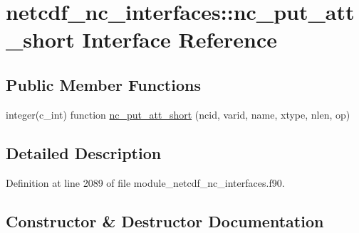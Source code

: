 \hypertarget{interfacenetcdf__nc__interfaces_1_1nc__put__att__short}{}\section{netcdf\+\_\+nc\+\_\+interfaces\+:\+:nc\+\_\+put\+\_\+att\+\_\+short Interface Reference}
\label{interfacenetcdf__nc__interfaces_1_1nc__put__att__short}
\subsection*{Public Member Functions}
\begin{DoxyCompactItemize}
\item 
integer(c\+\_\+int) function \hyperlink{interfacenetcdf__nc__interfaces_1_1nc__put__att__short_aa17e9ab9e0fbdb71f4bd739c1eb04017}{nc\+\_\+put\+\_\+att\+\_\+short} (ncid, varid, name, xtype, nlen, op)
\end{DoxyCompactItemize}


\subsection{Detailed Description}


Definition at line 2089 of file module\+\_\+netcdf\+\_\+nc\+\_\+interfaces.\+f90.



\subsection{Constructor \& Destructor Documentation}
\mbox{\label{interfacenetcdf__nc__interfaces_1_1nc__put__att__short_aa17e9ab9e0fbdb71f4bd739c1eb04017}} 
